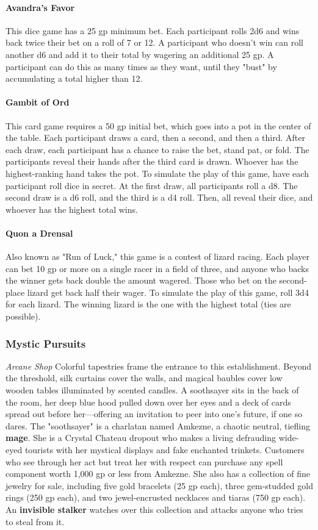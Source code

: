 \documentclass[10pt,a4,twoside,twocolumn,openany,nodeprecatedcode]{dndbook}
\begin{document}
\paragraph{Avandra's Favor}
This dice game has a 25 gp minimum bet. Each participant rolls 2d6 and wins back twice their bet on a roll of 7 or 12. A participant who doesn't win can roll another d6 and add it to their total by wagering an additional 25 gp. A participant can do this as many times as they want, until they "bust" by accumulating a total higher than 12.
\paragraph{Gambit of Ord}
This card game requires a 50 gp initial bet, which goes into a pot in the center of the table. Each participant draws a card, then a second, and then a third. After each draw, each participant has a chance to raise the bet, stand pat, or fold. The participants reveal their hands after the third card is drawn. Whoever has the highest-ranking hand takes the pot.
To simulate the play of this game, have each participant roll dice in secret. At the first draw, all participants roll a d8. The second draw is a d6 roll, and the third is a d4 roll. Then, all reveal their dice, and whoever has the highest total wins.
\paragraph{Quon a Drensal}
Also known as "Run of Luck," this game is a contest of lizard racing. Each player can bet 10 gp or more on a single racer in a field of three, and anyone who backs the winner gets back double the amount wagered. Those who bet on the second-place lizard get back half their wager.
To simulate the play of this game, roll 3d4 for each lizard. The winning lizard is the one with the highest total (ties are possible).
\subsubsection{Mystic Pursuits}
\textit{Arcane Shop}
Colorful tapestries frame the entrance to this establishment. Beyond the threshold, silk curtains cover the walls, and magical baubles cover low wooden tables illuminated by scented candles. A soothsayer sits in the back of the room, her deep blue hood pulled down over her eyes and a deck of cards spread out before her—offering an invitation to peer into one's future, if one so dares.
The "soothsayer" is a charlatan named Amkezne, a chaotic neutral, tiefling \textbf{mage}. She is a Crystal Chateau dropout who makes a living defrauding wide-eyed tourists with her mystical displays and fake enchanted trinkets. Customers who see through her act but treat her with respect can purchase any spell component worth 1,000 gp or less from Amkezne. She also has a collection of fine jewelry for sale, including five gold bracelets (25 gp each), three gem-studded gold rings (250 gp each), and two jewel-encrusted necklaces and tiaras (750 gp each). An \textbf{invisible stalker} watches over this collection and attacks anyone who tries to steal from it.
\end{document}
